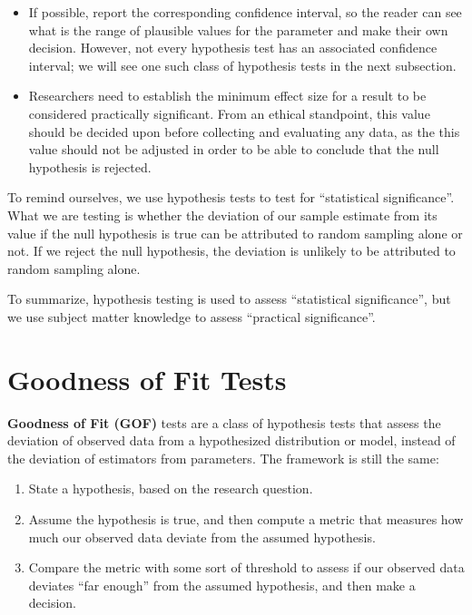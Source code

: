 \documentclass[
]{book}
\providecommand{\tightlist}{%
  \setlength{\itemsep}{0pt}\setlength{\parskip}{0pt}}
\begin{document}
\begin{itemize}
\item
  If possible, report the corresponding confidence interval, so the reader can see what is the range of plausible values for the parameter and make their own decision. However, not every hypothesis test has an associated confidence interval; we will see one such class of hypothesis tests in the next subsection.
\item
  Researchers need to establish the minimum effect size for a result to be considered practically significant. From an ethical standpoint, this value should be decided upon before collecting and evaluating any data, as the this value should not be adjusted in order to be able to conclude that the null hypothesis is rejected.
\end{itemize}

To remind ourselves, we use hypothesis tests to test for ``statistical significance''. What we are testing is whether the deviation of our sample estimate from its value if the null hypothesis is true can be attributed to random sampling alone or not. If we reject the null hypothesis, the deviation is unlikely to be attributed to random sampling alone.

To summarize, hypothesis testing is used to assess ``statistical significance'', but we use subject matter knowledge to assess ``practical significance''.

\section{Goodness of Fit Tests}\label{goodness-of-fit-tests}

\textbf{Goodness of Fit (GOF)} tests are a class of hypothesis tests that assess the deviation of observed data from a hypothesized distribution or model, instead of the deviation of estimators from parameters. The framework is still the same:

\begin{enumerate}
\def\labelenumi{\arabic{enumi}.}
\tightlist
\item
  State a hypothesis, based on the research question.
\item
  Assume the hypothesis is true, and then compute a metric that measures how much our observed data deviate from the assumed hypothesis.
\item
  Compare the metric with some sort of threshold to assess if our observed data deviates ``far enough'' from the assumed hypothesis, and then make a decision.
\end{enumerate}
\end{document}
